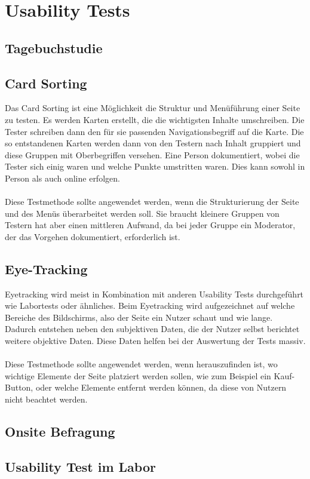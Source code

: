 \section{Usability Tests}
\subsection{Tagebuchstudie}
\subsection{Card Sorting}
Das Card Sorting ist eine Möglichkeit die Struktur und Menüführung einer Seite zu testen.
Es werden Karten erstellt, die die wichtigsten Inhalte umschreiben.
Die Tester schreiben dann den für sie passenden Navigationsbegriff auf die Karte.
Die so entstandenen Karten werden dann von den Testern nach Inhalt gruppiert und diese Gruppen mit Oberbegriffen versehen.
Eine Person dokumentiert, wobei die Tester sich einig waren und welche Punkte umstritten waren.
Dies kann sowohl in Person als auch online erfolgen.\\\\
Diese Testmethode sollte angewendet werden, wenn die Strukturierung der Seite und des Menüs überarbeitet werden soll.
Sie braucht kleinere Gruppen von Testern hat aber einen mittleren Aufwand, da bei jeder Gruppe ein Moderator, der das Vorgehen dokumentiert, erforderlich ist.

\subsection{Eye-Tracking}
Eyetracking wird meist in Kombination mit anderen Usability Tests durchgeführt wie Labortests oder ähnliches.
Beim Eyetracking wird aufgezeichnet auf welche Bereiche des Bildschirms, also der Seite ein Nutzer schaut und wie lange.
Dadurch entstehen neben den subjektiven Daten, die der Nutzer selbst berichtet weitere objektive Daten.
Diese Daten helfen bei der Auswertung der Tests massiv.\\\\
Diese Testmethode sollte angewendet werden, wenn herauszufinden ist, wo wichtige Elemente der Seite platziert werden sollen, wie zum Beispiel ein Kauf-Button,
oder welche Elemente entfernt werden können, da diese von Nutzern nicht beachtet werden.

\subsection{Onsite Befragung}


\subsection{Usability Test im Labor}